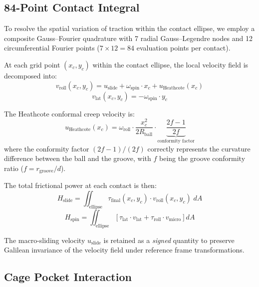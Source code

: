 \documentclass[preprint,12pt]{elsarticle}
\begin{document}
\subsection{84-Point Contact Integral}
\label{sec:integral}

To resolve the spatial variation of traction within the contact ellipse, we employ a composite Gauss--Fourier quadrature with 7 radial Gauss--Legendre nodes and 12 circumferential Fourier points ($7 \times 12 = 84$ evaluation points per contact).

At each grid point $(x_c, y_c)$ within the contact ellipse, the local velocity field is decomposed into:
\begin{equation}
    v_{\text{roll}}(x_c, y_c) = u_{\text{slide}} + \omega_{\text{spin}} \cdot x_c + u_{\text{Heathcote}}(x_c)
\end{equation}
\begin{equation}
    v_{\text{lat}}(x_c, y_c) = -\omega_{\text{spin}} \cdot y_c
\end{equation}

The Heathcote conformal creep velocity is:
\begin{equation}
    u_{\text{Heathcote}}(x_c) = \omega_{\text{roll}} \cdot \frac{x_c^2}{2R_{\text{ball}}} \cdot \underbrace{\frac{2f - 1}{2f}}_{\text{conformity factor}}
    \label{eq:heathcote}
\end{equation}
where the conformity factor $(2f-1)/(2f)$ correctly represents the curvature difference between the ball and the groove, with $f$ being the groove conformity ratio ($f = r_{\text{groove}}/d$).

The total frictional power at each contact is then:
\begin{equation}
    H_{\text{slide}} = \iint_{\text{ellipse}} \tau_{\text{final}}(x_c, y_c) \cdot v_{\text{roll}}(x_c, y_c) \; dA
\end{equation}
\begin{equation}
    H_{\text{spin}} = \iint_{\text{ellipse}} \left[\tau_{\text{lat}} \cdot v_{\text{lat}} + \tau_{\text{roll}} \cdot v_{\text{micro}}\right] dA
\end{equation}

The macro-sliding velocity $u_{\text{slide}}$ is retained as a \emph{signed} quantity to preserve Galilean invariance of the velocity field under reference frame transformations.


\subsection{Cage Pocket Interaction}
\label{sec:cage}
\end{document}
